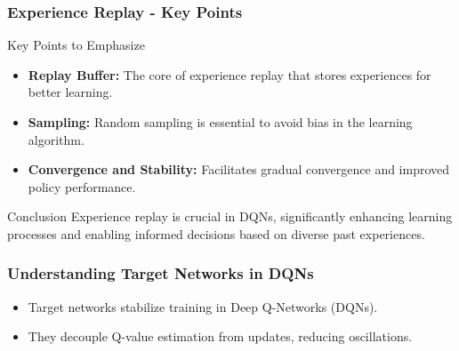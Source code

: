 \documentclass[aspectratio=169]{beamer}
\begin{document}
\begin{frame}[fragile]
    \frametitle{Experience Replay - Key Points}
    \begin{block}{Key Points to Emphasize}
        \begin{itemize}
            \item \textbf{Replay Buffer:} The core of experience replay that stores experiences for better learning.
            \item \textbf{Sampling:} Random sampling is essential to avoid bias in the learning algorithm.
            \item \textbf{Convergence and Stability:} Facilitates gradual convergence and improved policy performance.
        \end{itemize}
    \end{block}
    
    \begin{block}{Conclusion}
        Experience replay is crucial in DQNs, significantly enhancing learning processes and enabling informed decisions based on diverse past experiences.
    \end{block}
\end{frame}

\begin{frame}[fragile]
    \frametitle{Understanding Target Networks in DQNs}
    \begin{itemize}
        \item Target networks stabilize training in Deep Q-Networks (DQNs).
        \item They decouple Q-value estimation from updates, reducing oscillations.
    \end{itemize}
\end{frame}
\end{document}
